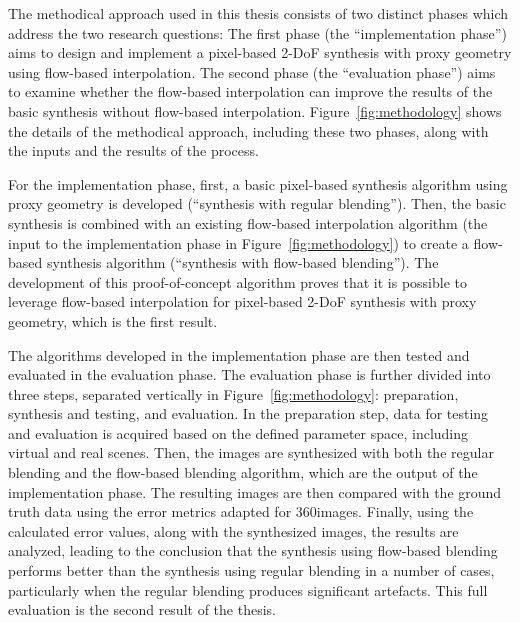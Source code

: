 The methodical approach used in this thesis consists of two distinct phases which address the two research questions: The first phase (the ``implementation phase'') aims to design and implement a pixel-based 2-DoF synthesis with proxy geometry using flow-based interpolation. The second phase (the ``evaluation phase'') aims to examine whether the flow-based interpolation can improve the results of the basic synthesis without flow-based interpolation. Figure~\ref{fig:methodology} shows the details of the methodical approach, including these two phases, along with the inputs and the results of the process.

For the implementation phase, first, a basic pixel-based synthesis algorithm using proxy geometry is developed (``synthesis with regular blending''). Then, the basic synthesis is combined with an existing flow-based interpolation algorithm (the input to the implementation phase in Figure~\ref{fig:methodology}) to create a flow-based synthesis algorithm (``synthesis with flow-based blending''). The development of this proof-of-concept algorithm proves that it is possible to leverage flow-based interpolation for pixel-based 2-DoF synthesis with proxy geometry, which is the first result.

The algorithms developed in the implementation phase are then tested and evaluated in the evaluation phase.
The evaluation phase is further divided into three steps, separated vertically in Figure~\ref{fig:methodology}: preparation, synthesis and testing, and evaluation. In the preparation step, data for testing and evaluation is acquired based on the defined parameter space, including virtual and real scenes. Then, the images are synthesized with both the regular blending and the flow-based blending algorithm, which are the output of the implementation phase. The resulting images are then compared with the ground truth data using the error metrics adapted for 360\degree images. 
Finally, using the calculated error values, along with the synthesized images, the results are analyzed, leading to the conclusion that the synthesis using flow-based blending performs better than the synthesis using regular blending in a number of cases, particularly when the regular blending produces significant artefacts. This full evaluation is the second result of the thesis.

